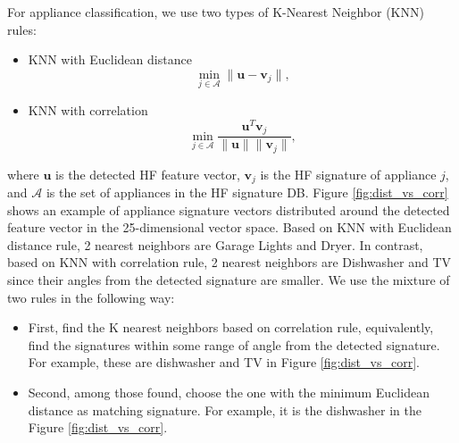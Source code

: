 \documentclass[11pt, letterpaper]{article}
\begin{document}
For appliance classification, we use two types of K-Nearest Neighbor (KNN) rules:
\begin{itemize}
\item KNN with Euclidean distance \[\min_{j\in\mathcal{A}} \|\mathbf{u}-\mathbf{v}_j\|, \]
\item KNN with correlation \[\min_{j\in\mathcal{A}} \frac{\mathbf{u}^T\mathbf{v}_j}{\|\mathbf{u}\|\|\mathbf{v}_j\|}, \]
\end{itemize}
where $\mathbf{u}$ is the detected HF feature vector, $\mathbf{v}_j$ is the HF signature of appliance $j$, and $\mathcal{A}$ is the set of appliances in the HF signature DB. Figure \ref{fig:dist_vs_corr} shows an example of appliance signature vectors distributed around the detected feature vector in the 25-dimensional vector space. Based on KNN with Euclidean distance rule, 2 nearest neighbors are Garage Lights and Dryer. In contrast, based on KNN with correlation rule, 2 nearest neighbors are Dishwasher and TV since their angles from the detected signature are smaller. We use the mixture of two rules in the following way:
\begin{itemize}
\item First, find the K nearest neighbors based on correlation rule, equivalently, find the signatures within some range of angle from the detected signature. For example, these are dishwasher and TV in Figure \ref{fig:dist_vs_corr}.
\item Second, among those found, choose the one with the minimum Euclidean distance as matching signature. For example, it is the dishwasher in the Figure \ref{fig:dist_vs_corr}.
\end{itemize}
\end{document}
